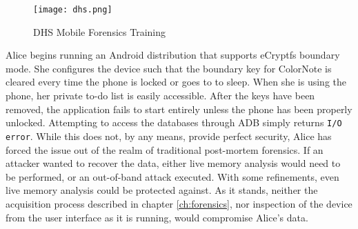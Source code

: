\begin{figure}[!htb]
\begin{center}
\texttt{[image: dhs.png]}
\end{center}
\caption{DHS Mobile Forensics Training} 
\label{fig:dhs}
\end{figure}

Alice begins running an Android distribution that supports eCryptfs boundary mode. She configures the device such that the boundary
key for ColorNote is cleared every time the phone is locked or goes to to sleep. When she is using the phone, her private to-do list
is easily accessible. After the keys have been removed, the application fails to start entirely unless the phone has been properly
unlocked. Attempting to access the databases through ADB simply returns \texttt{I/O error}. While this does not, by any means,
provide perfect security, Alice has forced the issue out of the realm of traditional post-mortem forensics. If an attacker wanted to
recover the data, either live memory analysis would need to be performed, or an out-of-band attack executed. With some refinements,
even live memory analysis could be protected against.  As it stands, neither the acquisition process described in chapter
\ref{ch:forensics}, nor inspection of the device from the user interface as it is running, would compromise Alice's data.
